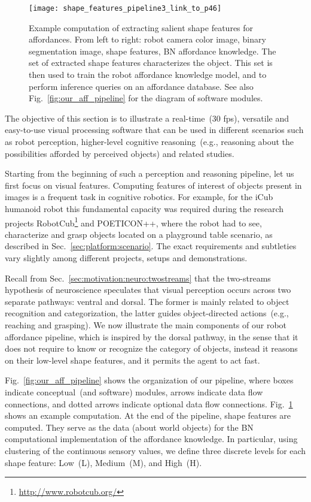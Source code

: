 \begin{figure}
\centering
\texttt{[image: shape\_features\_pipeline3\_link\_to\_p46]}
\caption[Example computation of extracting salient shape features for affordances.]{Example computation of extracting salient shape features for affordances.
From left to right: robot camera color image, binary segmentation image, shape features, \acl{BN} affordance knowledge.
The set of extracted shape features characterizes the object.
This set is then used to train the robot affordance knowledge model, and to perform inference queries on an affordance database.
See also Fig.~\ref{fig:our_aff_pipeline} for the diagram of software modules.}
\label{fig:shape_features_pipeline}
\end{figure}

The objective of this section is to illustrate a real-time~(30 fps), versatile and easy-to-use visual processing software that can be used in different scenarios such as robot perception, higher-level cognitive reasoning~(e.g., reasoning about the possibilities afforded by perceived objects) and related studies.

Starting from the beginning of such a perception and reasoning pipeline, let us first focus on visual features.
Computing features of interest of objects present in images is a frequent task in cognitive robotics.
For example, for the iCub humanoid robot this fundamental capacity was required during the research projects RobotCub\footnote{\url{http://www.robotcub.org/}} and POETICON++, where the robot had to see, characterize and grasp objects located on a playground table scenario, as described in Sec.~\ref{sec:platform:scenario}.
The exact requirements and subtleties vary slightly among different projects, setups and demonstrations.

Recall from Sec.~\ref{sec:motivation:neuro:twostreams} that the two-streams hypothesis of neuroscience speculates that visual perception occurs across two separate pathways: ventral and dorsal.
The former is mainly related to object recognition and categorization, the latter guides object-directed actions~(e.g., reaching and grasping).
We now illustrate the main components of our robot affordance pipeline, which is inspired by the dorsal pathway, in the sense that it does not require to know or recognize the category of objects, instead it reasons on their low-level shape features, and it permits the agent to act fast.

Fig.~\ref{fig:our_aff_pipeline} shows the organization of our pipeline, where boxes indicate conceptual~(and software) modules, arrows indicate data flow connections, and dotted arrows indicate optional data flow connections.
Fig.~\ref{fig:shape_features_pipeline} shows an example computation.
At the end of the pipeline, shape features are computed.
They serve as the data (about world objects) for the \ac{BN} computational implementation of the affordance knowledge.
In particular, using clustering of the continuous sensory values, we define three discrete levels for each shape feature: Low~(L), Medium~(M), and High~(H). \label{para:objects}

